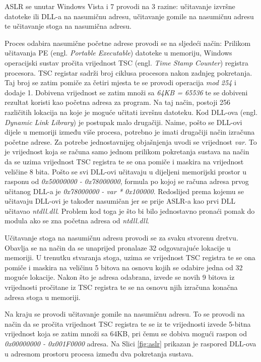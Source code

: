 \documentclass[times, utf8, diplomski, numeric]{fer}
\begin{document}
ASLR se unutar Windows Vista i 7 provodi na 3 razine: učitavanje
izvršne datoteke ili DLL-a na nasumičnu adresu, učitavanje gomile
na nasumičnu adresu te učitavanje stoga na nasumična adresu. 

Proces odabira nasumične početne adrese provodi se na sljedeći
način: Prilikom učitavanja PE (engl. \emph{Portable Executable}) 
datoteke u memoriju, Windows operacijski sustav pročita
vrijednost TSC (engl. \emph{Time Stamp Counter}) registra
procesora. TSC registar sadrži broj ciklusa procesora nakon
zadnjeg pokretanja. Taj broj se zatim pomiče za četiri mjesta te
se provodi operacija \emph{mod 254} i dodaje 1. Dobivena
vrijednost se zatim množi sa \emph{64KB = 65536} te se dobiveni
rezultat koristi kao početna adresa za program. Na taj način,
postoji 256 različitih lokacija na koje je moguće učitati izvršnu
datoteku. Kod DLL-ova (engl. \emph{Dynamic Link Library}) je
postupak malo drugačiji. Naime, pošto se DLL-ovi dijele u
memoriji između više procesa, potrebno je imati drugačiji način
izračuna početne adrese. Za potrebe jednostavnijeg objašnjenja
uvodi se vrijednost \emph{var}. To je vrijednost koja se računa
samo jednom prilikom pokretanja sustava na način da se uzima
vrijednost TSC registra te se ona pomiče i maskira na vrijednost
veličine 8 bita. Pošto se svi DLL-ovi učitavaju u dijeljeni
memorijski prostor u rasponu od \emph{0x50000000 - 0x78000000},
formula po kojoj se računa adresa prvog učitanog DLL-a je
\emph{0x78000000 - var * 0x100000}. Redoslijed prema kojemu se
učitavaju DLL-ovi je također nasumičan jer se prije ASLR-a kao
prvi DLL učitavao \emph{ntdll.dll}. Problem kod toga je što bi
bilo jednostavno pronaći pomak do modula ako se zna početna
adresa od \emph{ntdll.dll}. 

Učitavanje stoga na nasumičnu adresu provodi se za svaku stvorenu
dretvu. Obavlja se na način da se unaprijed pronalaze 32
odgovarajuće lokacije u memoriji. U trenutku stvaranja stoga,
uzima se vrijednost TSC registra te se ona pomiče i maskira na
veličinu 5 bitova na osnovu kojih se odabire jedna od 32 moguće
lokacije. Nakon što je adresa odabrana, izvede se novih 9 bitova
iz vrijednosti pročitane iz TSC registra te se na osnovu njih
izračuna konačna adresa stoga u memoriji.

Na kraju se provodi učitavanje gomile na nasumičnu adresu. To se
provodi na način da se pročita vrijednost TSC registra te se iz
te vrijednosti izvede 5-bitna vrijednost koja se zatim množi sa
64KB, pri čemu se dobiva mogući raspon od \emph{0x00000000 -
0x001F0000} adresa. Na Slici \ref{fig:aslr} prikazan je raspored
DLL-ova u adresnom prostoru procesa između dva pokretanja
sustava.
\end{document}
